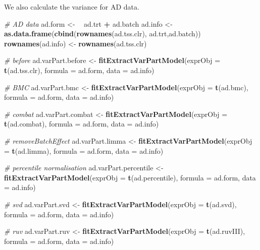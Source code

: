 \documentclass[]{book}
\newenvironment{Shaded}{\begin{snugshade}}{\end{snugshade}}
\newcommand{\KeywordTok}[1]{\textcolor[rgb]{0.13,0.29,0.53}{\textbf{#1}}}
\newcommand{\DataTypeTok}[1]{\textcolor[rgb]{0.13,0.29,0.53}{#1}}
\newcommand{\StringTok}[1]{\textcolor[rgb]{0.31,0.60,0.02}{#1}}
\newcommand{\CommentTok}[1]{\textcolor[rgb]{0.56,0.35,0.01}{\textit{#1}}}
\newcommand{\OperatorTok}[1]{\textcolor[rgb]{0.81,0.36,0.00}{\textbf{#1}}}
\newcommand{\ErrorTok}[1]{\textcolor[rgb]{0.64,0.00,0.00}{\textbf{#1}}}
\newcommand{\NormalTok}[1]{#1}
\begin{document}
We also calculate the variance for AD data.

\begin{Shaded}
\begin{Highlighting}[]
\CommentTok{# AD data}
\NormalTok{ad.form <-}\StringTok{ }\ErrorTok{~}\StringTok{ }\NormalTok{ad.trt }\OperatorTok{+}\StringTok{ }\NormalTok{ad.batch}
\NormalTok{ad.info <-}\StringTok{ }\KeywordTok{as.data.frame}\NormalTok{(}\KeywordTok{cbind}\NormalTok{(}\KeywordTok{rownames}\NormalTok{(ad.tss.clr), ad.trt,ad.batch))}
\KeywordTok{rownames}\NormalTok{(ad.info) <-}\StringTok{ }\KeywordTok{rownames}\NormalTok{(ad.tss.clr)}

\CommentTok{# before}
\NormalTok{ad.varPart.before <-}\StringTok{ }\KeywordTok{fitExtractVarPartModel}\NormalTok{(}\DataTypeTok{exprObj =} \KeywordTok{t}\NormalTok{(ad.tss.clr), }
                                            \DataTypeTok{formula =}\NormalTok{ ad.form, }\DataTypeTok{data =}\NormalTok{ ad.info)}

\CommentTok{# BMC}
\NormalTok{ad.varPart.bmc <-}\StringTok{ }\KeywordTok{fitExtractVarPartModel}\NormalTok{(}\DataTypeTok{exprObj =} \KeywordTok{t}\NormalTok{(ad.bmc), }
                                         \DataTypeTok{formula =}\NormalTok{ ad.form, }\DataTypeTok{data =}\NormalTok{ ad.info)}

\CommentTok{# combat}
\NormalTok{ad.varPart.combat <-}\StringTok{ }\KeywordTok{fitExtractVarPartModel}\NormalTok{(}\DataTypeTok{exprObj =} \KeywordTok{t}\NormalTok{(ad.combat), }
                                            \DataTypeTok{formula =}\NormalTok{ ad.form, }\DataTypeTok{data =}\NormalTok{ ad.info)}

\CommentTok{# removeBatchEffect}
\NormalTok{ad.varPart.limma <-}\StringTok{ }\KeywordTok{fitExtractVarPartModel}\NormalTok{(}\DataTypeTok{exprObj =} \KeywordTok{t}\NormalTok{(ad.limma), }
                                           \DataTypeTok{formula =}\NormalTok{ ad.form, }\DataTypeTok{data =}\NormalTok{ ad.info)}

\CommentTok{# percentile normalisation}
\NormalTok{ad.varPart.percentile <-}\StringTok{ }\KeywordTok{fitExtractVarPartModel}\NormalTok{(}\DataTypeTok{exprObj =} \KeywordTok{t}\NormalTok{(ad.percentile), }
                                                \DataTypeTok{formula =}\NormalTok{ ad.form, }\DataTypeTok{data =}\NormalTok{ ad.info)}

\CommentTok{# svd}
\NormalTok{ad.varPart.svd <-}\StringTok{ }\KeywordTok{fitExtractVarPartModel}\NormalTok{(}\DataTypeTok{exprObj =} \KeywordTok{t}\NormalTok{(ad.svd), }
                                         \DataTypeTok{formula =}\NormalTok{ ad.form, }\DataTypeTok{data =}\NormalTok{ ad.info)}

\CommentTok{# ruv}
\NormalTok{ad.varPart.ruv <-}\StringTok{ }\KeywordTok{fitExtractVarPartModel}\NormalTok{(}\DataTypeTok{exprObj =} \KeywordTok{t}\NormalTok{(ad.ruvIII), }
                                         \DataTypeTok{formula =}\NormalTok{ ad.form, }\DataTypeTok{data =}\NormalTok{ ad.info)}
\end{Highlighting}
\end{Shaded}
\end{document}
